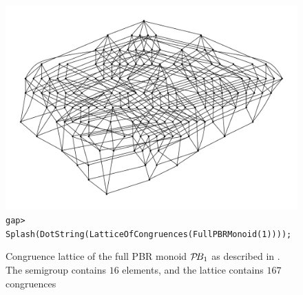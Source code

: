 \begin{figure}[ht]
  \centering
  \includegraphics[width=\textwidth]{pics/ch-lattice/pbr1.pdf}
  \texttt{gap> Splash(DotString(LatticeOfCongruences(FullPBRMonoid(1))));}
  \caption[Congruence lattice of the full PBR monoid $\PBR_1$]
  {Congruence lattice of the full PBR monoid $\PBR_1$ as described in
    \cite[\S2.1]{diagram_semigroups}.  The semigroup contains $16$ elements, and
    the lattice contains $167$ congruences}
  \label{fig:pbr1-lattice}
\end{figure}

